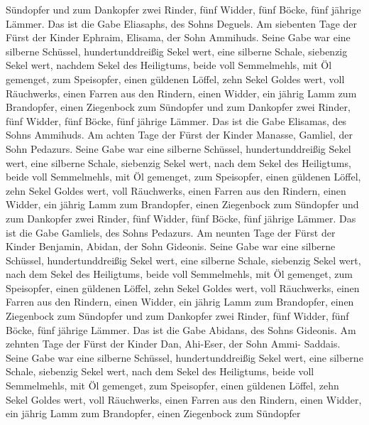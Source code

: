 Sündopfer  und zum Dankopfer zwei Rinder, fünf Widder, fünf
Böcke, fünf jährige Lämmer. Das ist die Gabe Eliasaphs, des Sohns
Deguels.  Am siebenten Tage der Fürst der Kinder Ephraim,
Elisama, der Sohn Ammihuds.  Seine Gabe war eine silberne
Schüssel, hundertunddreißig Sekel wert, eine silberne Schale, siebenzig
Sekel wert, nachdem Sekel des Heiligtums, beide voll Semmelmehls, mit Öl
gemenget, zum Speisopfer,  einen güldenen Löffel, zehn
Sekel Goldes wert, voll Räuchwerks,  einen Farren aus den
Rindern, einen Widder, ein jährig Lamm zum Brandopfer, 
einen Ziegenbock zum Sündopfer  und zum Dankopfer zwei
Rinder, fünf Widder, fünf Böcke, fünf jährige Lämmer. Das ist die Gabe
Elisamas, des Sohns Ammihuds.  Am achten Tage der Fürst der
Kinder Manasse, Gamliel, der Sohn Pedazurs.  Seine Gabe war
eine silberne Schüssel, hundertunddreißig Sekel wert, eine silberne
Schale, siebenzig Sekel wert, nach dem Sekel des Heiligtums, beide voll
Semmelmehls, mit Öl gemenget, zum Speisopfer,  einen
güldenen Löffel, zehn Sekel Goldes wert, voll Räuchwerks, 
einen Farren aus den Rindern, einen Widder, ein jährig Lamm zum
Brandopfer,  einen Ziegenbock zum Sündopfer 
und zum Dankopfer zwei Rinder, fünf Widder, fünf Böcke, fünf jährige
Lämmer. Das ist die Gabe Gamliels, des Sohns Pedazurs.  Am
neunten Tage der Fürst der Kinder Benjamin, Abidan, der Sohn Gideonis.
 Seine Gabe war eine silberne Schüssel, hundertunddreißig
Sekel wert, eine silberne Schale, siebenzig Sekel wert, nach dem Sekel
des Heiligtums, beide voll Semmelmehls, mit Öl gemenget, zum Speisopfer,
 einen güldenen Löffel, zehn Sekel Goldes wert, voll
Räuchwerks,  einen Farren aus den Rindern, einen Widder,
ein jährig Lamm zum Brandopfer,  einen Ziegenbock zum
Sündopfer  und zum Dankopfer zwei Rinder, fünf Widder, fünf
Böcke, fünf jährige Lämmer. Das ist die Gabe Abidans, des Sohns
Gideonis.  Am zehnten Tage der Fürst der Kinder Dan,
Ahi-Eser, der Sohn Ammi- Saddais.  Seine Gabe war eine
silberne Schüssel, hundertunddreißig Sekel wert, eine silberne Schale,
siebenzig Sekel wert, nach dem Sekel des Heiligtums, beide voll
Semmelmehls, mit Öl gemenget, zum Speisopfer,  einen
güldenen Löffel, zehn Sekel Goldes wert, voll Räuchwerks, 
einen Farren aus den Rindern, einen Widder, ein jährig Lamm zum
Brandopfer,  einen Ziegenbock zum Sündopfer 
